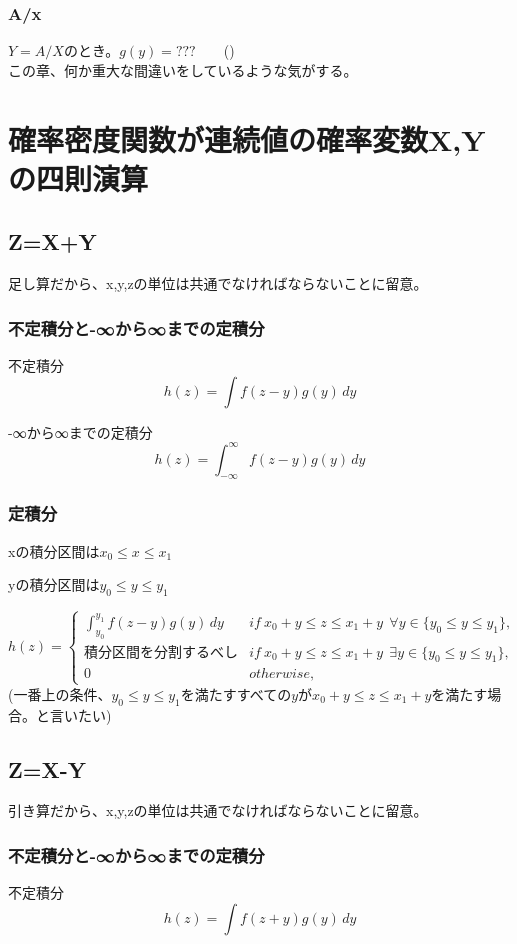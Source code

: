 \documentclass[a4paper,11pt]{ltjsarticle}
\begin{document}
\subsubsection{A/x}
$Y=A/X$のとき。$g(y) = ???$\ \ \ \ ()\\
この章、何か重大な間違いをしているような気がする。
\newpage


\section{確率密度関数が連続値の確率変数X,Yの四則演算}
\subsection{Z=X+Y}
足し算だから、x,y,zの単位は共通でなければならないことに留意。
\subsubsection{不定積分と-∞から∞までの定積分}
不定積分
$$
    h(z) = \int f(z-y) g(y)\,dy
$$

-∞から∞までの定積分
$$
    h(z) = \int_{-\infty}^{\infty} f(z-y) g(y)\,dy
$$
\subsubsection{定積分}
\begin{description}
    \item xの積分区間は$x_0 \leq x \leq x_1$
    \item yの積分区間は$y_0 \leq y \leq y_1$
\end{description}
$$
    h(z)=
    \begin{cases}
        \int_{y_0}^{y_1} f(z-y) g(y)\,dy    & if\ x_0+y \leq z \leq x_1+y \ \ \forall y\in \{ y_0 \leq y \leq y_1\}, \\
        積分区間を分割するべし                & if\ x_0+y \leq z \leq x_1+y \ \ \exists y\in \{ y_0 \leq y \leq y_1\}, \\
        0                                   & otherwise,
    \end{cases}
$$
(一番上の条件、$y_0 \leq y \leq y_1$を満たすすべての$y$が$x_0+y \leq z \leq x_1+y$を満たす場合。と言いたい)


\subsection{Z=X-Y}
引き算だから、x,y,zの単位は共通でなければならないことに留意。
\subsubsection{不定積分と-∞から∞までの定積分}
不定積分
$$
    h(z) = \int f(z+y) g(y)\,dy
$$
\end{document}
